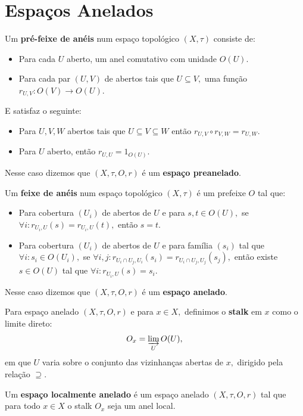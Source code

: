 \documentclass[11pt,twoside,a4paper]{book}
\begin{document}
\section{Espaços Anelados}

\begin{definicao}
Um \textbf{pré-feixe de anéis} num espaço topológico $(X,\tau)$ consiste de:
\begin{itemize}
    \item Para cada $U$ aberto, um anel comutativo com unidade $O(U)$.
    \item Para cada par $(U,V)$ de abertos tais que $U\subseteq V,$ uma função $r_{U,V}:O(V)\rightarrow O(U).$
\end{itemize}
E satisfaz o seguinte:
\begin{itemize}
    \item Para $U,V,W$ abertos tais que $U\subseteq V\subseteq W$ então $r_{U,V}\circ r_{V,W}=r_{U,W}.$
    \item Para $U$ aberto, então $r_{U,U}=1_{O(U)}.$
\end{itemize}
Nesse caso dizemos que $(X,\tau,O,r)$ é um \textbf{espaço preanelado}.
\end{definicao}

\begin{definicao}
Um \textbf{feixe de anéis} num espaço topológico $(X,\tau)$ é um prefeixe $O$ tal que:
\begin{itemize}
    \item Para cobertura $(U_i)$ de abertos de $U$ e para $s,t\in O(U),$ se $\forall i:r_{U_i,U}(s)=r_{U_i,U}(t),$ então $s=t.$
    \item Para cobertura $(U_i)$ de abertos de $U$ e para família $(s_i)$ tal que $\forall i:s_i\in O(U_i),$ se $\forall i,j:r_{U_i\cap U_j,U_i}(s_i)=r_{U_i\cap U_j,U_j}(s_j),$ então existe $s\in O(U)$ tal que $\forall i:r_{U_i,U}(s)=s_i.$
\end{itemize}
Nesse caso dizemos que $(X,\tau,O,r)$ é um \textbf{espaço anelado}.
\end{definicao}

\begin{definicao}
Para espaço anelado $(X,\tau,O,r)$ e para $x\in X,$ definimos o \textbf{stalk} em $x$ como o limite direto:
\[
O_x=\varinjlim\limits_{U}O(U),
\]
em que $U$ varia sobre o conjunto das vizinhanças abertas de $x,$ dirigido pela relação $\supseteq.$
\end{definicao}

\begin{definicao}
Um \textbf{espaço localmente anelado} é um espaço anelado $(X,\tau,O,r)$ tal que para todo $x\in X$ o stalk $O_x$ seja um anel local.
\end{definicao}
\end{document}
